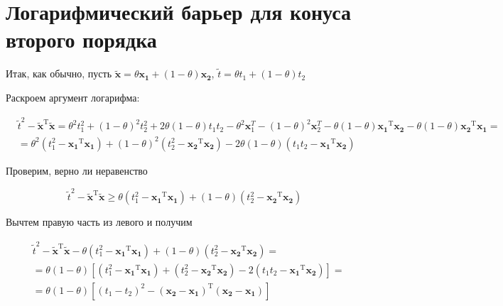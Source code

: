 	\section{Логарифмический барьер для конуса второго порядка}
	
	Итак, как обычно, пусть $\mathbf{\tilde{x}} = \theta \mathbf{x_1} +  (1 -
	\theta) \mathbf{x_2}$, $\tilde{t} = \theta t_1 + (1 - \theta) t_2$
	
	Раскроем аргумент логарифма:
	
	\begin{equation}
	\begin{split}
	&\tilde{t}^2 - \mathbf{\tilde{x}}^\text{T} \mathbf{\tilde{x}} = \theta^2 t_1^2
	+ (1-\theta)^2 t_2^2 + 2\theta(1-\theta)t_1 t_2 - \theta^2 \mathbf{x}_1^{T} -(1-
	\theta)^2 \mathbf{x}_2^{T} - \theta (1- \theta)\mathbf{x_1}^\text{T}
	\mathbf{x_2} - \theta (1- \theta)\mathbf{x_2}^\text{T} \mathbf{x_1} = \\
	&=\theta^2(t_1^2 - \mathbf{x_1}^\text{T} \mathbf{x_1}) + (1-\theta)^2(t_2^2 -
	\mathbf{x_2}^\text{T} \mathbf{x_2}) - 2\theta (1-\theta)(t_1 t_2 -
	\mathbf{x_1}^\text{T} \mathbf{x_2})
	\end{split}
	\end{equation}
	
	Проверим, верно ли неравенство
	
	\begin{equation}
	\label{62}
	\tilde{t}^2 - \mathbf{\tilde{x}}^\text{T} \mathbf{\tilde{x}} \geqslant \theta
	(t_1^2 - \mathbf{x_1}^\text{T} \mathbf{x_1}) + (1-\theta)(t_2^2 -
	\mathbf{x_2}^\text{T} \mathbf{x_2})
	\end{equation}
	
	Вычтем правую часть из левого и получим
	
	
	
	\begin{equation}
	\begin{split}
	\label{63}
	&\tilde{t}^2 - \mathbf{\tilde{x}}^\text{T} \mathbf{\tilde{x}} - \theta (t_1^2 -
	\mathbf{x_1}^\text{T} \mathbf{x_1}) + (1-\theta)(t_2^2 - \mathbf{x_2}^\text{T}
	\mathbf{x_2}) = \\
	&= \theta(1-\theta) \left[ (t_1^2 - \mathbf{x_1}^\text{T} \mathbf{x_1}) +
	(t_2^2 - \mathbf{x_2}^\text{T} \mathbf{x_2}) - 2(t_1 t_2 - \mathbf{x_1}^\text{T}
	\mathbf{x_2})\right] = \\
	&=\theta(1-\theta) \left[ (t_1-t_2)^2 - (\mathbf{x_2} -
	\mathbf{x_1})^\text{T}(\mathbf{x_2} - \mathbf{x_1})\right] 
	\end{split}
	\end{equation}
	
